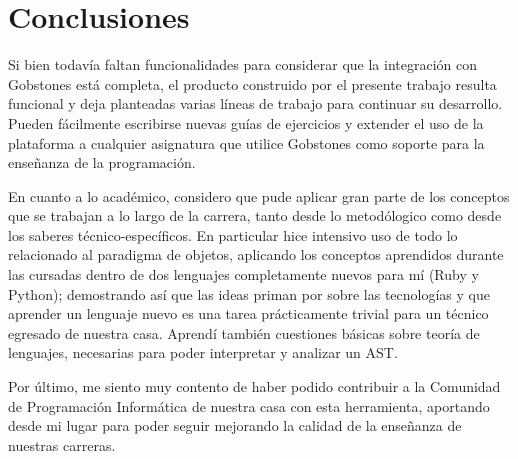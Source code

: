 
\section{Conclusiones}
Si bien todavía faltan funcionalidades para considerar que la integración con Gobstones está completa, el producto construido por el presente trabajo resulta funcional y deja planteadas varias líneas de trabajo para continuar su desarrollo. Pueden fácilmente escribirse nuevas guías de ejercicios y extender el uso de la plataforma a cualquier asignatura que utilice Gobstones como soporte para la enseñanza de la programación.

En cuanto a lo académico, considero que pude aplicar gran parte de los conceptos que se trabajan a lo largo de la carrera, tanto desde lo metodólogico como desde los saberes técnico-específicos. En particular hice intensivo uso de todo lo relacionado al paradigma de objetos, aplicando los conceptos aprendidos durante las cursadas dentro de dos lenguajes completamente nuevos para mí (Ruby y Python); demostrando así que las ideas priman por sobre las tecnologías y que aprender un lenguaje nuevo es una tarea prácticamente trivial para un técnico egresado de nuestra casa. Aprendí también cuestiones básicas sobre teoría de lenguajes, necesarias para poder interpretar y analizar un AST.

Por último, me siento muy contento de haber podido contribuir a la Comunidad de Programación Informática de nuestra casa con esta herramienta, aportando desde mi lugar para poder seguir mejorando la calidad de la enseñanza de nuestras carreras.
